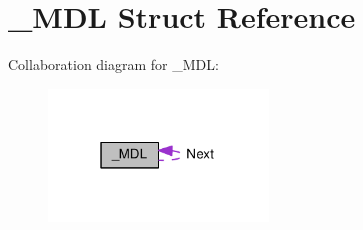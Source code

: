\hypertarget{struct__MDL}{}\section{\+\_\+\+M\+D\+L Struct Reference}
\label{struct__MDL}


Collaboration diagram for \+\_\+\+M\+D\+L\+:
\nopagebreak
\begin{figure}[H]
\begin{center}
\leavevmode
\includegraphics[width=166pt]{struct__MDL__coll__graph}
\end{center}
\end{figure}
